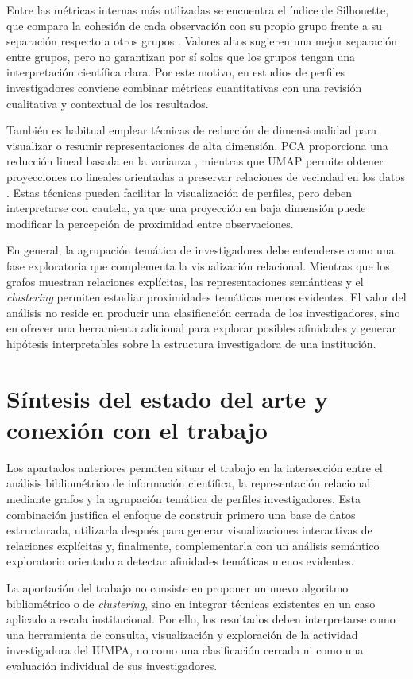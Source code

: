 \documentclass[11pt,spanish,listoffigures,listoftables]{tfgetsinf}
\begin{document}
Entre las métricas internas más utilizadas se encuentra el índice de Silhouette, que compara la cohesión de cada observación con su propio grupo frente a su separación respecto a otros grupos \cite{rousseeuw}. Valores altos sugieren una mejor separación entre grupos, pero no garantizan por sí solos que los grupos tengan una interpretación científica clara. Por este motivo, en estudios de perfiles investigadores conviene combinar métricas cuantitativas con una revisión cualitativa y contextual de los resultados.

También es habitual emplear técnicas de reducción de dimensionalidad para visualizar o resumir representaciones de alta dimensión. PCA proporciona una reducción lineal basada en la varianza \cite{jolliffe}, mientras que UMAP permite obtener proyecciones no lineales orientadas a preservar relaciones de vecindad en los datos \cite{umap}. Estas técnicas pueden facilitar la visualización de perfiles, pero deben interpretarse con cautela, ya que una proyección en baja dimensión puede modificar la percepción de proximidad entre observaciones.

En general, la agrupación temática de investigadores debe entenderse como una fase exploratoria que complementa la visualización relacional. Mientras que los grafos muestran relaciones explícitas, las representaciones semánticas y el \textit{clustering} permiten estudiar proximidades temáticas menos evidentes. El valor del análisis no reside en producir una clasificación cerrada de los investigadores, sino en ofrecer una herramienta adicional para explorar posibles afinidades y generar hipótesis interpretables sobre la estructura investigadora de una institución.

\section{Síntesis del estado del arte y conexión con el trabajo}

Los apartados anteriores permiten situar el trabajo en la intersección entre el análisis bibliométrico de información científica, la representación relacional mediante grafos y la agrupación temática de perfiles investigadores. Esta combinación justifica el enfoque de construir primero una base de datos estructurada, utilizarla después para generar visualizaciones interactivas de relaciones explícitas y, finalmente, complementarla con un análisis semántico exploratorio orientado a detectar afinidades temáticas menos evidentes.

La aportación del trabajo no consiste en proponer un nuevo algoritmo bibliométrico o de \textit{clustering}, sino en integrar técnicas existentes en un caso aplicado a escala institucional. Por ello, los resultados deben interpretarse como una herramienta de consulta, visualización y exploración de la actividad investigadora del IUMPA, no como una clasificación cerrada ni como una evaluación individual de sus investigadores.
\end{document}

